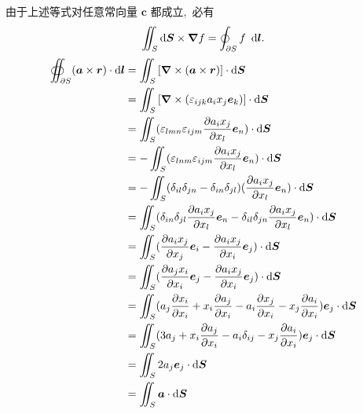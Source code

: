 由于上述等式对任意常向量 $\boldsymbol c$ 都成立, \,必有
\[
\iint_S \dif \boldsymbol S \times \boldsymbol{\nabla} f
=
\oint_{\partial S} f\, \,\dif \boldsymbol l.
\]
\begin{align*}
    \oiint_{\partial S}(\boldsymbol{a}\times\boldsymbol{r})\cdot\dif\boldsymbol{l}
    &=\iint_S\left[\boldsymbol{\nabla}\times(\boldsymbol{a}\times\boldsymbol{r})\right]\cdot\dif\boldsymbol{S}\\
    &=\iint_S\left[\boldsymbol{\nabla}\times(\varepsilon_{ijk}a_ix_j\boldsymbol{e}_k)\right]\cdot\dif\boldsymbol{S}\\
    &=\iint_S(\varepsilon_{lmn}\varepsilon_{ijm}\frac{\partial a_ix_j}{\partial x_l}\boldsymbol{e}_n)\cdot\dif\boldsymbol{S}\\
    &=-\iint_S(\varepsilon_{lnm}\varepsilon_{ijm}\frac{\partial a_ix_j}{\partial x_l}\boldsymbol{e}_n)\cdot\dif\boldsymbol{S}\\
    &=-\iint_S(\delta_{il}\delta_{jn}-\delta_{in}\delta_{jl})(\frac{\partial a_ix_j}{\partial x_l}\boldsymbol{e}_n)\cdot\dif\boldsymbol{S}\\
    &=\iint_S(\delta_{in}\delta_{jl}\frac{\partial a_ix_j}{\partial x_l}\boldsymbol{e}_n-\delta_{il}\delta_{jn}\frac{\partial a_ix_j}{\partial x_l}\boldsymbol{e}_n)\cdot\dif\boldsymbol{S}\\
    &=\iint_S(\frac{\partial a_ix_j}{\partial x_j}\boldsymbol{e}_i-\frac{\partial a_ix_j}{\partial x_i}\boldsymbol{e}_j)\cdot\dif\boldsymbol{S}\\
    &=\iint_S(\frac{\partial a_jx_i}{\partial x_i}\boldsymbol{e}_j-\frac{\partial a_ix_j}{\partial x_i}\boldsymbol{e}_j)\cdot\dif\boldsymbol{S}\\
    &=\iint_S(a_j\frac{\partial x_i}{\partial x_i}
    +x_i\frac{\partial a_j}{\partial x_i}
    -a_i\frac{\partial x_j}{\partial x_i}
    -x_j\dfrac{\partial a_i}{\partial x_i})\boldsymbol{e}_j\cdot\dif\boldsymbol{S}\\
    &=\iint_S(3a_j
    +x_i\frac{\partial a_j}{\partial x_i}
    -a_i\delta_{ij}
    -x_j\dfrac{\partial a_i}{\partial x_i})\boldsymbol{e}_j\cdot\dif\boldsymbol{S}\\
    &=\iint_S2a_j\boldsymbol{e}_j\cdot\dif\boldsymbol{S}\\
    &=\iint_S\boldsymbol{a}\cdot\dif\boldsymbol{S}
\end{align*}
